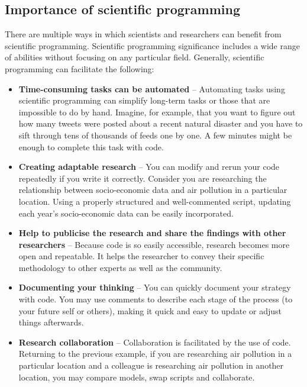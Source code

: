 \documentclass[
]{book}
\providecommand{\tightlist}{%
  \setlength{\itemsep}{0pt}\setlength{\parskip}{0pt}}
\begin{document}
\hypertarget{importance-of-scientific-programming}{%
\subsection*{Importance of scientific programming}\label{importance-of-scientific-programming}}

There are multiple ways in which scientists and researchers can benefit from scientific programming. Scientific programming significance includes a wide range of abilities without focusing on any particular field. Generally, scientific programming can facilitate the following:

\begin{itemize}
\tightlist
\item
  \textbf{Time-consuming tasks can be automated} -- Automating tasks using scientific programming can simplify long-term tasks or those that are impossible to do by hand. Imagine, for example, that you want to figure out how many tweets were posted about a recent natural disaster and you have to sift through tens of thousands of feeds one by one. A few minutes might be enough to complete this task with code.
\item
  \textbf{Creating adaptable research} -- You can modify and rerun your code repeatedly if you write it correctly. Consider you are researching the relationship between socio-economic data and air pollution in a particular location. Using a properly structured and well-commented script, updating each year's socio-economic data can be easily incorporated.
\item
  \textbf{Help to publicise the research and share the findings with other researchers} -- Because code is so easily accessible, research becomes more open and repeatable. It helps the researcher to convey their specific methodology to other experts as well as the community.
\item
  \textbf{Documenting your thinking} -- You can quickly document your strategy with code. You may use comments to describe each stage of the process (to your future self or others), making it quick and easy to update or adjust things afterwards.
\item
  \textbf{Research collaboration} -- Collaboration is facilitated by the use of code. Returning to the previous example, if you are researching air pollution in a particular location and a colleague is researching air pollution in another location, you may compare models, swap scripts and collaborate.
\end{itemize}
\end{document}
